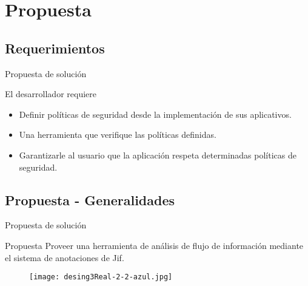  \section{Propuesta}
\subsection{Requerimientos}
\begin{frame}{Propuesta de solución}
	\begin{block}{El desarrollador requiere}
		\begin{itemize}
		  \item Definir políticas de seguridad desde la implementación de sus aplicativos.
		  \item Una herramienta que verifique las políticas definidas.
		  \item Garantizarle al usuario que la aplicación respeta determinadas
		  políticas de seguridad.
		\end{itemize}
	\end{block}
\end{frame}

\subsection{Propuesta - Generalidades}
\begin{frame}{Propuesta de solución}
	\begin{block}{Propuesta}
		  Proveer una herramienta de análisis de flujo de información mediante el
		  sistema de anotaciones de Jif.
	\end{block}
	\begin{figure}[t!]
		\begin{center} 
		\texttt{[image: desing3Real-2-2-azul.jpg]} 
		\end{center}
	\end{figure}
\end{frame}

